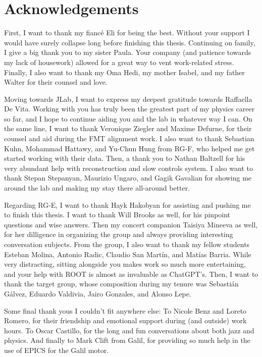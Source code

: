 \section*{Acknowledgements}
    First, I want to thank my fiancé Eli for being the best.
    Without your support I would have surely collapse long before finishing this thesis.
    Continuing on family, I give a big thank you to my sister Paula.
    Your company (and patience towards my lack of housework) allowed for a great way to vent work-related stress.
    Finally, I also want to thank my Oma Hedi, my mother Isabel, and my father Walter for their counsel and love.

    Moving towards JLab, I want to express my deepest gratitude towards Raffaella De Vita.
    Working with you has truly been the greatest part of my physics career so far, and I hope to continue aiding you and the lab in whatever way I can.
    On the same line, I want to thank Veronique Ziegler and Maxime Defurne, for their counsel and aid during the FMT alignment work.
    I also want to thank Sebastian Kuhn, Mohammad Hattawy, and Yu-Chun Hung from RG-F, who helped me get started working with their data.
    Then, a thank you to Nathan Baltzell for his very abundant help with reconstruction and slow controls system.
    I also want to thank Stepan Stepanyan, Maurizio Ungaro, and Gagik Gavalian for showing me around the lab and making my stay there all-around better.

    Regarding RG-E, I want to thank Hayk Hakobyan for assisting and pushing me to finish this thesis.
    I want to thank Will Brooks as well, for his pinpoint questions and wise answers.
    Then my concert companion Taisiya Mineeva as well, for her dilligence in organizing the group and always providing interesting conversation subjects.
    From the group, I also want to thank my fellow students Esteban Molina, Antonio Radic, Claudio San Martín, and Matías Barria.
    While very distracting, sitting alongside you makes work so much more entertaining, and your help with ROOT is almost as invaluable as ChatGPT's.
    Then, I want to thank the target group, whose composition during my tenure was Sebastián Gálvez, Eduardo Valdivia, Jairo Gonzales, and Alonso Lepe.

    Some final thank yous I couldn't fit anywhere else:
    To Nicole Benz and Loreto Romero, for their friendship and emotional support during (and outside) work hours.
    To Oscar Castillo, for the long and fun conversations about both jazz and physics.
    And finally to Mark Clift from Galil, for providing so much help in the use of EPICS for the Galil motor.

